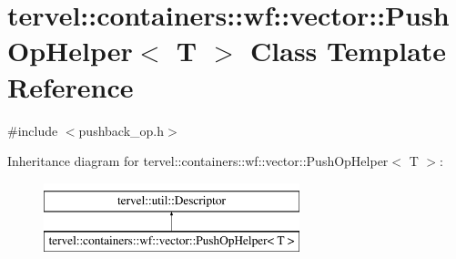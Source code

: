 \hypertarget{classtervel_1_1containers_1_1wf_1_1vector_1_1_push_op_helper}{}\section{tervel\+:\+:containers\+:\+:wf\+:\+:vector\+:\+:Push\+Op\+Helper$<$ T $>$ Class Template Reference}
\label{classtervel_1_1containers_1_1wf_1_1vector_1_1_push_op_helper}


{\ttfamily \#include $<$pushback\+\_\+op.\+h$>$}

Inheritance diagram for tervel\+:\+:containers\+:\+:wf\+:\+:vector\+:\+:Push\+Op\+Helper$<$ T $>$\+:\begin{figure}[H]
\begin{center}
\leavevmode
\includegraphics[height=2.000000cm]{classtervel_1_1containers_1_1wf_1_1vector_1_1_push_op_helper}
\end{center}
\end{figure}
